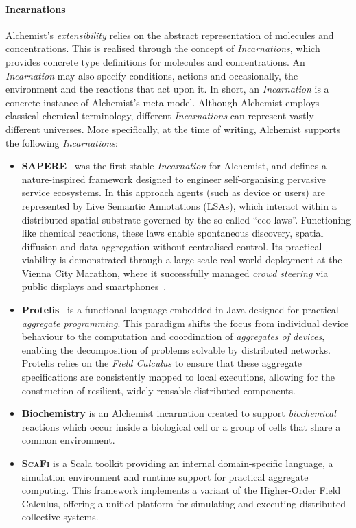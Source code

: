 \paragraph{Incarnations} Alchemist's \emph{extensibility} relies on the
abstract representation of molecules and concentrations. This is realised
through the concept of \emph{Incarnations}, which provides concrete type
definitions for molecules and concentrations. An \emph{Incarnation} may also
specify conditions, actions and occasionally, the environment and the
reactions that act upon it. In short, an \emph{Incarnation} is a concrete
instance of Alchemist's meta-model. Although Alchemist employs classical
chemical terminology, different \emph{Incarnations} can represent vastly
different universes. More specifically, at the time of writing, Alchemist
supports the following \emph{Incarnations}:

\begin{itemize}
	\item \textbf{SAPERE}~\cite{pianiniCISFPSE} was the first stable
	      \emph{Incarnation} for Alchemist, and defines a nature-inspired
	      framework designed to engineer self-organising pervasive service
	      ecosystems. In this approach agents (such as device or users) are
	      represented by Live Semantic Annotations (LSAs), which interact within
	      a distributed spatial substrate governed by the so called ``eco-laws''.
	      Functioning like chemical reactions, these laws enable spontaneous
	      discovery, spatial diffusion and data aggregation without centralised
	      control. Its practical viability is demonstrated through a large-scale
	      real-world deployment at the Vienna City Marathon, where it
	      successfully managed \emph{crowd steering} via public displays and
	      smartphones~\cite{zambonelli2015DPMASNIC}.
	\item \textbf{Protelis}~\cite{pianini2015PROTELIS} is a
	      functional language embedded in Java designed for practical
	      \emph{aggregate programming}. This paradigm shifts the focus from
	      individual device behaviour to the computation and coordination of
	      \emph{aggregates of devices}, enabling the decomposition of problems
	      solvable by distributed networks. Protelis relies on the \emph{Field
		      Calculus} to ensure that these aggregate specifications are
	      consistently mapped to local executions, allowing for the construction
	      of resilient, widely reusable distributed components.
	\item \textbf{Biochemistry} is an Alchemist incarnation created to support
	      \emph{biochemical} reactions which occur inside a biological cell or a
	      group of cells that share a common environment.
	\item \textbf{\textsc{ScaFi}} is a Scala toolkit providing an internal
	      domain-specific language, a simulation environment and runtime support
	      for practical aggregate computing. This framework implements a variant of
	      the Higher-Order Field Calculus, offering a unified platform for
	      simulating and executing distributed collective systems.
\end{itemize}

